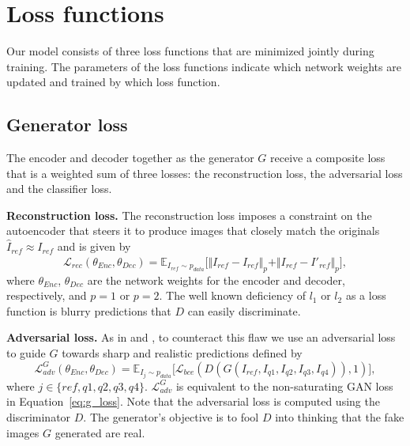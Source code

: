 \documentclass[a4paper,12pt]{report}
\begin{document}
\section{Loss functions}
Our model consists of three loss functions that are minimized jointly during training. The parameters of the loss functions indicate which network weights are updated and trained by which loss function.

\subsection{Generator loss}
The encoder and decoder together as the generator $G$ receive a composite loss that is a weighted sum of three losses: the reconstruction loss, the adversarial loss and the classifier loss.

\textbf{Reconstruction loss.} The reconstruction loss imposes a constraint on the autoencoder that steers it to produce images that closely match the originals $\hat{I}_{ref} \approx I_{ref}$ and is given by
\begin{equation} \label{eq:4}
    \mathcal{L}_{rec}(\theta_{Enc},\theta_{Dec}) = \mathbb{E}_{I_{ref}\sim p_{data}}\big[ \Vert I_{ref} - \hat{I}_{ref} \Vert_p + \Vert I_{ref} - I'_{ref} \Vert_p \big],
\end{equation}
where $\theta_{Enc}$, $\theta_{Dec}$ are the network weights for the encoder and decoder, respectively, and $p = 1$ or $p = 2$. The well known deficiency of $l_1$ or $l_2$ as a loss function is blurry predictions that $D$ can easily discriminate.

\textbf{Adversarial loss.} As in \cite{DisentFacOfVarByMixTh} and \cite{1511.05440}, to counteract this flaw we use an adversarial loss to guide $G$ towards sharp and realistic predictions defined by
\begin{equation} \label{eq:5}
    \mathcal{L}^G_{adv}(\theta_{Enc},\theta_{Dec}) = \mathbb{E}_{I_{j}\sim p_{data}}\big[ \mathcal{L}_{bce}(D(G(I_{ref},I_{q1},I_{q2},I_{q3},I_{q4})), 1)\big],
\end{equation}
where $j \in \{ref,q1,q2,q3,q4\}$. $\mathcal{L}^G_{adv}$ is equivalent to the non-saturating GAN loss in Equation~\ref{eq:g_loss}. Note that the adversarial loss is computed using the discriminator $D$. The generator's objective is to fool $D$ into thinking that the fake images $G$ generated are real.
\end{document}
